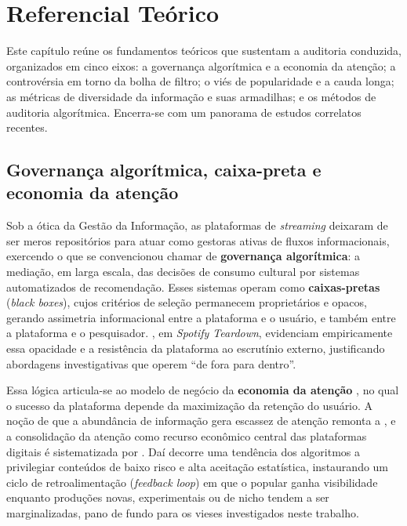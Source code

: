 \documentclass[12pt, %
openright,
oneside, %
a4paper,    %
english,   %
brazil]{facom-ufu-abntex2}
\begin{document}
\chapter{Referencial Teórico}

Este capítulo reúne os fundamentos teóricos que sustentam a auditoria conduzida,
organizados em cinco eixos: a governança algorítmica e a economia da atenção; a
controvérsia em torno da bolha de filtro; o viés de popularidade e a cauda longa;
as métricas de diversidade da informação e suas armadilhas; e os métodos de
auditoria algorítmica. Encerra-se com um panorama de estudos correlatos recentes.

\section{Governança algorítmica, caixa-preta e economia da atenção}

Sob a ótica da Gestão da Informação, as plataformas de \emph{streaming} deixaram
de ser meros repositórios para atuar como gestoras ativas de fluxos
informacionais, exercendo o que se convencionou chamar de \textbf{governança
algorítmica}: a mediação, em larga escala, das decisões de consumo cultural por
sistemas automatizados de recomendação. Esses sistemas operam como
\textbf{caixas-pretas} (\emph{black boxes}), cujos critérios de seleção
permanecem proprietários e opacos, gerando assimetria informacional entre a
plataforma e o usuário, e também entre a plataforma e o pesquisador.
, em \emph{Spotify Teardown}, evidenciam
empiricamente essa opacidade e a resistência da plataforma ao escrutínio externo,
justificando abordagens investigativas que operem ``de fora para dentro''.

Essa lógica articula-se ao modelo de negócio da \textbf{economia da atenção}
\cite{simon1971designing,davenport2001attention}, no
qual o sucesso da plataforma depende da maximização da retenção do usuário. A
noção de que a abundância de informação gera escassez de atenção remonta a
, e a consolidação da atenção como recurso
econômico central das plataformas digitais é sistematizada por
. Daí
decorre uma tendência dos algoritmos a privilegiar conteúdos de baixo risco e
alta aceitação estatística, instaurando um ciclo de retroalimentação
(\emph{feedback loop}) em que o popular ganha visibilidade enquanto produções
novas, experimentais ou de nicho tendem a ser marginalizadas, pano de fundo
para os vieses investigados neste trabalho.
\end{document}
